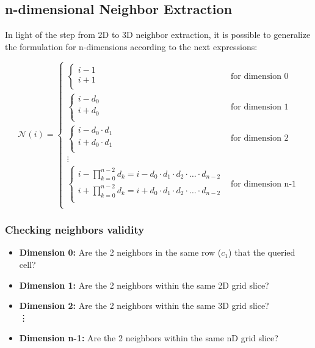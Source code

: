 \documentclass[12pt]{article}
\begin{document}
\subsection{n-dimensional Neighbor Extraction}
In light of the step from 2D to 3D neighbor extraction, it is possible to generalize the formulation for n-dimensions according to
the next expressions:

\begin{equation}
  \mathcal{N}(i) =
  \begin{cases}
    \begin{cases}
      i-1\\
      i+1\\
    \end{cases} & \text{for dimension 0}\\
    \begin{cases}
      i-d_0\\
      i+d_0\\
    \end{cases} & \text{for dimension 1}\\
    \begin{cases}
      i-d_0\cdot d_1\\
      i+d_0\cdot d_1\\
    \end{cases} & \text{for dimension 2}\\
      \vdots \\
    \begin{cases}
      i - \prod_{k=0}^{n-2}d_k = i-d_0\cdot d_1\cdot d_2 \cdot \dots \cdot d_{n-2}\\
      i + \prod_{k=0}^{n-2}d_k = i+d_0\cdot d_1\cdot d_2 \cdot \dots \cdot d_{n-2}\\
    \end{cases} & \text{for dimension n-1}\\
  \end{cases}
  \label{eq:nd_neighbors}
\end{equation}


\subsubsection{Checking neighbors validity}
\begin{itemize}
 \item \textbf{Dimension 0:} Are the 2 neighbors in the same row ($c_1$) that the queried cell?
 \item \textbf{Dimension 1:} Are the 2 neighbors within the same 2D grid slice?
 \item \textbf{Dimension 2:} Are the 2 neighbors within the same 3D grid slice? \\
 \vdots
 \item \textbf{Dimension n-1:} Are the 2 neighbors within the same nD grid slice?
\end{itemize}
\end{document}
